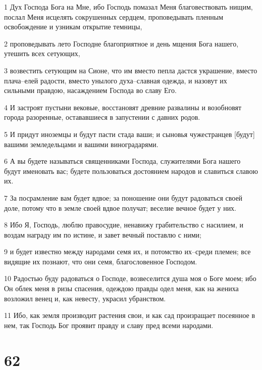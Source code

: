 \par 1 Дух Господа Бога на Мне, ибо Господь помазал Меня благовествовать нищим, послал Меня исцелять сокрушенных сердцем, проповедывать пленным освобождение и узникам открытие темницы,
\par 2 проповедывать лето Господне благоприятное и день мщения Бога нашего, утешить всех сетующих,
\par 3 возвестить сетующим на Сионе, что им вместо пепла дастся украшение, вместо плача--елей радости, вместо унылого духа--славная одежда, и назовут их сильными правдою, насаждением Господа во славу Его.
\par 4 И застроят пустыни вековые, восстановят древние развалины и возобновят города разоренные, остававшиеся в запустении с давних родов.
\par 5 И придут иноземцы и будут пасти стада ваши; и сыновья чужестранцев [будут] вашими земледельцами и вашими виноградарями.
\par 6 А вы будете называться священниками Господа, служителями Бога нашего будут именовать вас; будете пользоваться достоянием народов и славиться славою их.
\par 7 За посрамление вам будет вдвое; за поношение они будут радоваться своей доле, потому что в земле своей вдвое получат; веселие вечное будет у них.
\par 8 Ибо Я, Господь, люблю правосудие, ненавижу грабительство с насилием, и воздам награду им по истине, и завет вечный поставлю с ними;
\par 9 и будет известно между народами семя их, и потомство их--среди племен; все видящие их познают, что они семя, благословенное Господом.
\par 10 Радостью буду радоваться о Господе, возвеселится душа моя о Боге моем; ибо Он облек меня в ризы спасения, одеждою правды одел меня, как на жениха возложил венец и, как невесту, украсил убранством.
\par 11 Ибо, как земля производит растения свои, и как сад произращает посеянное в нем, так Господь Бог проявит правду и славу пред всеми народами.

\chapter{62}

